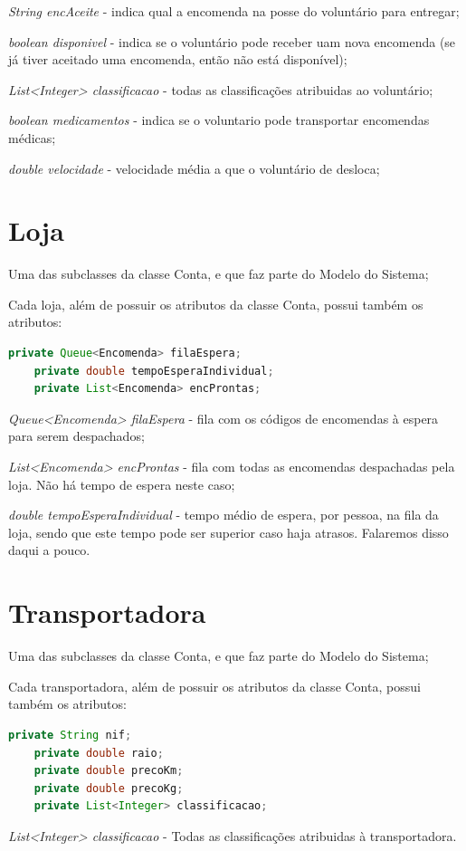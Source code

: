 \documentclass[a4paper]{report}
\begin{document}
\textit{String encAceite} - indica qual a encomenda na posse do voluntário para entregar;

\textit{boolean disponivel}  - indica se o voluntário pode receber uam nova encomenda (se já tiver aceitado uma encomenda, então não está disponível);

\textit{List<Integer> classificacao} - todas as classificações atribuidas ao voluntário;

\textit{boolean medicamentos} - indica se o voluntario pode transportar encomendas médicas;

\textit{double velocidade} - velocidade média a que o voluntário de desloca;
	
	\section{Loja}
	Uma das subclasses da classe Conta, e que faz parte do Modelo do Sistema;
	
	Cada loja, além de possuir os atributos da classe Conta, possui também os atributos:
	\begin{lstlisting}[language=Java]
	private Queue<Encomenda> filaEspera;
	private double tempoEsperaIndividual;
	private List<Encomenda> encProntas;
	\end{lstlisting}
	\textit{Queue<Encomenda> filaEspera} - fila com os códigos de encomendas à espera para serem despachados; 
	
	\textit{List<Encomenda> encProntas} - fila com todas as encomendas despachadas pela loja. Não há tempo de espera neste caso;
	
	\textit{double tempoEsperaIndividual} - tempo médio de espera, por pessoa, na fila da loja, sendo que este tempo pode ser superior caso haja atrasos. Falaremos disso daqui a pouco.
	
	
	\section{Transportadora}
	Uma das subclasses da classe Conta, e que faz parte do Modelo do Sistema;
	
	Cada transportadora, além de possuir os atributos da classe Conta, possui também os atributos:
	\begin{lstlisting}[language=Java]
	private String nif;
	private double raio;
	private double precoKm;
	private double precoKg;
	private List<Integer> classificacao;
	\end{lstlisting}
	\textit{List<Integer> classificacao} - Todas as classificações atribuidas à transportadora.
	
\end{document}
